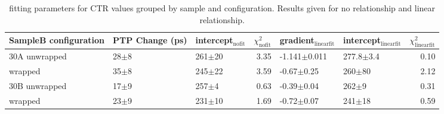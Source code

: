 \begin{table}
\caption{\label{tab:ctrfitresults} fitting parameters for CTR values grouped by sample and configuration. Results given for no relationship and linear relationship.}
\begin{tabular}{lllrllr}
\hline
SampleB configuration & PTP Change (ps) & intercept$_\text{nofit}$ &  $\chi^2_\text{nofit}$ & gradient$_\text{linearfit}$ & intercept$_\text{linearfit}$ &  $\chi^2_\text{linearfit}$ \\
\hline
30A     unwrapped     &  28$\pm$8 &      261$\pm$20 &                   3.35 &    -1.141$\pm$0.011 &      277.8$\pm$3.4 &                    0.10 \\
        wrapped       &  35$\pm$8 &      245$\pm$22 &                   3.59 &      -0.67$\pm$0.25 &         260$\pm$80 &                    2.12 \\
30B     unwrapped     &  17$\pm$9 &       257$\pm$4 &                   0.63 &      -0.39$\pm$0.04 &          262$\pm$9 &                    0.31 \\
        wrapped       &  23$\pm$9 &      231$\pm$10 &                   1.69 &      -0.72$\pm$0.07 &         241$\pm$18 &                    0.59 \\
\hline
\end{tabular}
\end{table}